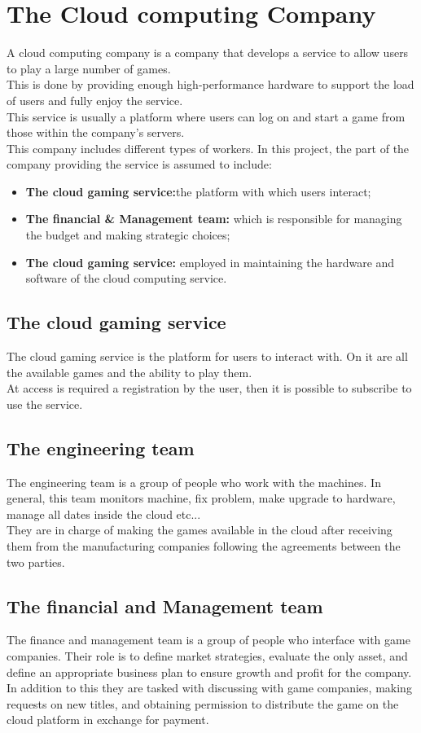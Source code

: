 \documentclass[a4paper,12pt]{report}
\begin{document}
\newpage
%
\section{The Cloud computing Company }
A cloud computing company is a company that develops a service to allow users to play a large number of games.\\
This is done by providing enough high-performance hardware to support the load of users and fully enjoy the service.\\
This service is usually a platform where users can log on and start a game from those within the company's servers.\\
This company includes different types of workers. In this project, the part of the company providing the service is assumed to include:
\begin{itemize}
\item{\textbf{The cloud gaming service:}the platform with which users interact;}
\item{\textbf{The financial \& Management team:} which is responsible for managing the budget and making strategic choices;}
\item{\textbf{The cloud gaming service:} employed in maintaining the hardware and software of the cloud computing service.}
\end{itemize}
%
\subsection{The cloud gaming service }
The cloud gaming service is the platform for users to interact with. On it are all the available games and the ability to play them. \\
At access is required a registration by the user, then it is possible to subscribe to use the service. 
%  
\subsection{The engineering team }
The engineering team is a group of people who work with the machines. In general, this team monitors machine, fix problem, make upgrade to hardware, manage all dates inside the cloud etc... \\
They are in charge of making the games available in the cloud after receiving them from the manufacturing companies following the agreements between the two parties.
%
\subsection{The financial and Management team }
The finance and management team is a group of people who interface with game companies. Their role is to define market strategies, evaluate the only asset, and define an appropriate business plan to ensure growth and profit for the company. In addition to this they are tasked with discussing with game companies, making requests on new titles, and obtaining permission to distribute the game on the cloud platform in exchange for payment. 
%
\end{document}

